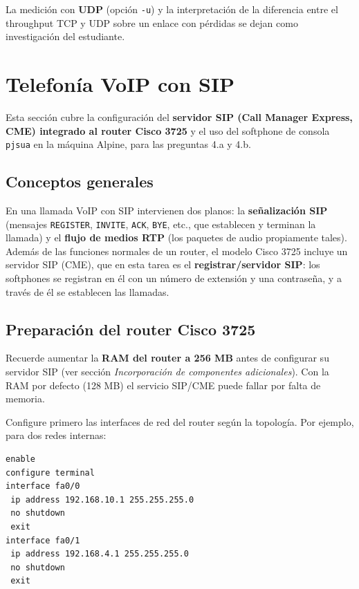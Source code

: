 \documentclass[letterpaper,12pt]{article}
\begin{document}
\begin{investigar}
La medición con \textbf{UDP} (opción \texttt{-u}) y la interpretación de la diferencia entre el throughput TCP y UDP sobre un enlace con pérdidas se dejan como investigación del estudiante.
\end{investigar}

\section{Telefonía VoIP con SIP}

Esta sección cubre la configuración del \textbf{servidor SIP (Call Manager Express, CME) integrado al router Cisco 3725} y el uso del softphone de consola \texttt{pjsua} en la máquina Alpine, para las preguntas 4.a y 4.b.

\subsection{Conceptos generales}

En una llamada VoIP con SIP intervienen dos planos: la \textbf{señalización SIP} (mensajes \texttt{REGISTER}, \texttt{INVITE}, \texttt{ACK}, \texttt{BYE}, etc., que establecen y terminan la llamada) y el \textbf{flujo de medios RTP} (los paquetes de audio propiamente tales). Además de las funciones normales de un router, el modelo Cisco 3725 incluye un servidor SIP (CME), que en esta tarea es el \textbf{registrar/servidor SIP}: los softphones se registran en él con un número de extensión y una contraseña, y a través de él se establecen las llamadas.

\subsection{Preparación del router Cisco 3725}

\begin{nota}
Recuerde aumentar la \textbf{RAM del router a 256 MB} antes de configurar su servidor SIP (ver sección \textit{Incorporación de componentes adicionales}). Con la RAM por defecto (128 MB) el servicio SIP/CME puede fallar por falta de memoria.
\end{nota}

Configure primero las interfaces de red del router según la topología. Por ejemplo, para dos redes internas:

\begin{lstlisting}
enable
configure terminal
interface fa0/0
 ip address 192.168.10.1 255.255.255.0
 no shutdown
 exit
interface fa0/1
 ip address 192.168.4.1 255.255.255.0
 no shutdown
 exit
\end{lstlisting}
\end{document}
